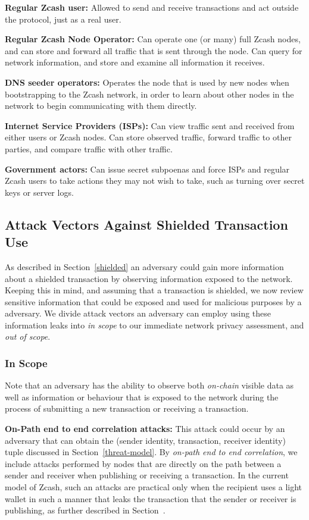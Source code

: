 \documentclass{article}
\begin{document}
\textbf{Regular Zcash user:} Allowed to send and receive transactions and act
outside the protocol, just as a real user.

\textbf{Regular Zcash Node Operator:} Can operate one (or many) full Zcash
nodes, and can store and forward all traffic that is sent through the node. Can
query for network information, and store and examine all information it
receives.

\textbf{DNS seeder operators:} Operates the node that is used by new nodes when
bootstrapping to the Zcash network, in order to learn about other nodes in the
network to begin communicating with them directly.

\textbf{Internet Service Providers (ISPs):} Can view traffic sent and received
from either users or Zcash nodes. Can store observed traffic, forward traffic
to other parties, and compare traffic with other traffic.

\textbf{Government actors:} Can issue secret subpoenas and force ISPs and
regular Zcash users to take actions they may not wish to take, such as turning
over secret keys or server logs.


\subsection{Attack Vectors Against Shielded Transaction Use}
As described in Section~\ref{shielded} an adversary could gain more information
about a shielded transaction by observing information exposed to the network.
Keeping this in mind, and assuming that a transaction is shielded, we now
review sensitive information that could be exposed and used for malicious
purposes by a adversary.
We divide attack vectors an adversary can employ using these information leaks
into \emph{in scope} to our immediate network privacy assessment, and \emph{out
of scope}.

\subsubsection{In Scope}
\label{in-scope}

Note that an adversary has the ability to observe both \emph{on-chain} visible
data as well as information or behaviour that is exposed to the network during
the process of submitting a new transaction or receiving a transaction.

\textbf{On-Path end to end correlation attacks:} This attack could occur by an
adversary that can obtain the (sender identity, transaction, receiver identity)
tuple discussed in Section~\ref{threat-model}. By \emph{on-path end to end
correlation}, we include attacks performed by nodes that are directly on the
path between a sender and receiver when publishing or receiving a transaction.
In the current model of Zcash, such an attacks are practical
only when the recipient uses a light wallet in such a manner that leaks the
transaction that the sender or receiver is publishing, as further described in
Section~\cite{light-wallet-spec}.
\end{document}
